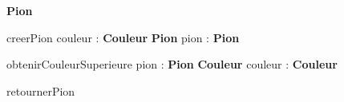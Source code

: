 \begin{algorithme}
  \begin{enregistrement}{\textbf{Pion}}
  \end{enregistrement}
\end{algorithme}

\vspace*{5mm} 

\begin{algorithme}
  \small
  \fonction
      {creerPion}
      {couleur : \textbf{Couleur}}
      {\textbf{Pion}}
      {pion : \textbf{Pion}}
      {{}

        {}}
\end{algorithme}

\vspace*{5mm} 

\begin{algorithme}
  \small
  \fonction
      {obtenirCouleurSuperieure}
      {pion : \textbf{Pion}}
      {\textbf{Couleur}}
      {couleur : \textbf{Couleur}}
      {}
\end{algorithme}

\vspace*{5mm} 

\begin{algorithme}
  \small
  \procedure
      {retournerPion}
      {}
      {}
      {}
\end{algorithme}
